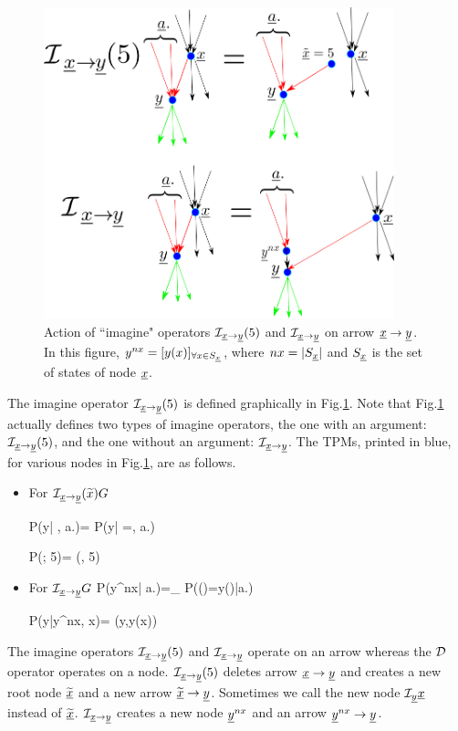 \begin{figure}[h!]
\centering
\includegraphics[width=4in]
{counterf/kappa.png}
\caption{Action of ``imagine" operators
${\cal I}_{{\underline{x}}\rightarrow {\underline{y}}}(5)$
and ${\cal I}_{{\underline{x}}\rightarrow {\underline{y}}}$
on arrow ${\underline{x}}\rightarrow {\underline{y}}$.
In this figure, $y^{nx}=[y(x)]_{\forall x\in S_{\underline{x}}}$,
where $nx=|S_{\underline{x}}|$
and $S_{\underline{x}}$ is the set of states of node ${\underline{x}}$.
}
\label{fig-kappa}
\end{figure}

The imagine operator  ${\cal I}_{{\underline{x}}\rightarrow {\underline{y}}}(5)$
is defined graphically in Fig.\ref{fig-kappa}.
Note that Fig.\ref{fig-kappa}
actually defines two types
of imagine operators, the one
with an argument:
${\cal I}_{{\underline{x}}\rightarrow {\underline{y}}}(5)$,
and the one without an argument:
${\cal I}_{{\underline{x}}\rightarrow {\underline{y}}}$.
The TPMs, printed in blue,
for various nodes in
Fig.\ref{fig-kappa}, are as follows.



\begin{itemize}

\item
For ${\cal I}_{{\underline{x}}\rightarrow
{\underline{y}}}(\widetilde{x})G$

\beq\color{blue}
P(y| , a.)=
P(y| \rvx=, a.)
\eeq

\beq\color{blue}
P(; 5)=
\delta(, 5)
\eeq

\item
For ${\cal I}_{{\underline{x}}\rightarrow {\underline{y}}}G$
\beq\color{blue}
P(y^{nx}| a.)=\prod_{}
P(\rvy()=y()|a.)
\eeq

\beq\color{blue}
P(y|y^{nx}, x)=
\delta(y,y(x))
\eeq
\end{itemize}
The imagine operators
${\cal I}_{{\underline{x}}\rightarrow{\underline{y}}}(5)$
and ${\cal I}_{{\underline{x}}\rightarrow{\underline{y}}}$
operate on an arrow
whereas the
${\cal D}$ operator
 operates on a node.
${\cal I}_{{\underline{x}}\rightarrow{\underline{y}}}(5)$
deletes
arrow ${\underline{x}}\rightarrow{\underline{y}}$
and
creates a new root node
$\widetilde{{\underline{x}}}$
and a new arrow
$\widetilde{{\underline{x}}}\rightarrow {\underline{y}}$.
Sometimes we call
the new node
${\cal I}_{\underline{y}}{\underline{x}}$
instead of
 $\widetilde{{\underline{x}}}$.
${\cal I}_{{\underline{x}}\rightarrow{\underline{y}}}$
creates
a new node ${\underline{y}}^{nx}$
and an arrow ${\underline{y}}^{nx}\rightarrow {\underline{y}}$.



